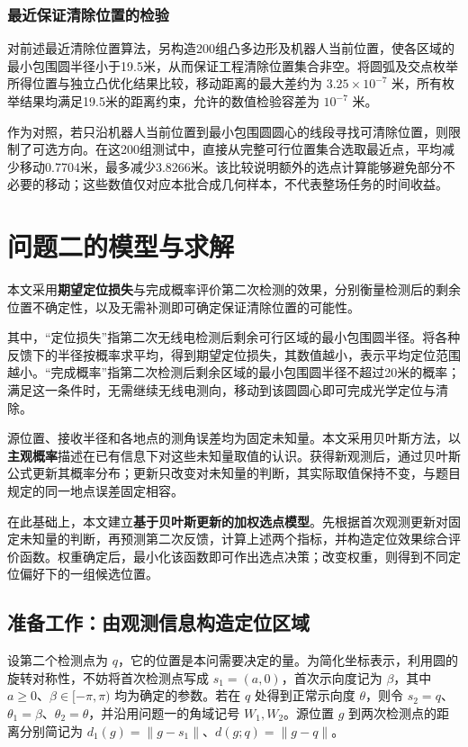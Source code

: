 \documentclass[UTF8,a4paper,zihao=-4,fontset=none]{ctexart}
\begin{document}
\subsubsection{最近保证清除位置的检验}

对前述最近清除位置算法，另构造200组凸多边形及机器人当前位置，使各区域的最小包围圆半径小于19.5米，从而保证工程清除位置集合非空。将圆弧及交点枚举所得位置与独立凸优化结果比较，移动距离的最大差约为 \(3.25\times10^{-7}\) 米，所有枚举结果均满足19.5米的距离约束，允许的数值检验容差为 \(10^{-7}\) 米。

作为对照，若只沿机器人当前位置到最小包围圆圆心的线段寻找可清除位置，则限制了可选方向。在这200组测试中，直接从完整可行位置集合选取最近点，平均减少移动0.7704米，最多减少3.8266米。该比较说明额外的选点计算能够避免部分不必要的移动；这些数值仅对应本批合成几何样本，不代表整场任务的时间收益。

\section{问题二的模型与求解}

本文采用\textbf{期望定位损失}与{完成概率}评价第二次检测的效果，分别衡量检测后的剩余位置不确定性，以及无需补测即可确定保证清除位置的可能性。

其中，“定位损失”指第二次无线电检测后剩余可行区域的最小包围圆半径。将各种反馈下的半径按概率求平均，得到期望定位损失，其数值越小，表示平均定位范围越小。“完成概率”指第二次检测后剩余区域的最小包围圆半径不超过20米的概率；满足这一条件时，无需继续无线电测向，移动到该圆圆心即可完成光学定位与清除。

源位置、接收半径和各地点的测角误差均为固定未知量。本文采用贝叶斯方法，以\textbf{主观概率}描述在已有信息下对这些未知量取值的认识。获得新观测后，通过贝叶斯公式更新其概率分布；更新只改变对未知量的判断，其实际取值保持不变，与题目规定的同一地点误差固定相容。

在此基础上，本文建立\textbf{基于贝叶斯更新的加权选点模型}。先根据首次观测更新对固定未知量的判断，再预测第二次反馈，计算上述两个指标，并构造定位效果综合评价函数。权重确定后，最小化该函数即可作出选点决策；改变权重，则得到不同定位偏好下的一组候选位置。

\subsection{准备工作：由观测信息构造定位区域}

设第二个检测点为 \(q\)，它的位置是本问需要决定的量。为简化坐标表示，利用圆的旋转对称性，不妨将首次检测点写成 \(s_1=(a,0)\)，首次示向度记为 \(\beta\)，其中 \(a\ge0\)、\(\beta\in[-\pi,\pi)\) 均为确定的参数。若在 \(q\) 处得到正常示向度 \(\theta\)，则令 \(s_2=q\)、\(\theta_1=\beta\)、\(\theta_2=\theta\)，并沿用问题一的角域记号 \(W_1,W_2\)。源位置 \(g\) 到两次检测点的距离分别简记为 \(d_1(g)=\|g-s_1\|\)、\(d(g;q)=\|g-q\|\)。
\end{document}
